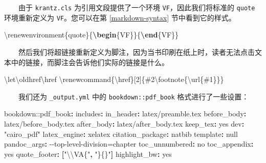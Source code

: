 \documentclass[
  12pt,
]{krantz}
\newenvironment{Shaded}{\begin{snugshade}}{\end{snugshade}}
\newcommand{\AttributeTok}[1]{\textcolor[rgb]{0.77,0.63,0.00}{#1}}
\newcommand{\CharTok}[1]{\textcolor[rgb]{0.31,0.60,0.02}{#1}}
\newcommand{\ExtensionTok}[1]{#1}
\newcommand{\FunctionTok}[1]{\textcolor[rgb]{0.00,0.00,0.00}{#1}}
\newcommand{\KeywordTok}[1]{\textcolor[rgb]{0.13,0.29,0.53}{\textbf{#1}}}
\newcommand{\NormalTok}[1]{#1}
\newcommand{\SpecialCharTok}[1]{\textcolor[rgb]{0.00,0.00,0.00}{#1}}
\newcommand{\StringTok}[1]{\textcolor[rgb]{0.31,0.60,0.02}{#1}}
\theoremstyle{definition}
\theoremstyle{definition}
\theoremstyle{definition}
\theoremstyle{definition}
\theoremstyle{remark}
\begin{document}
  由于 \texttt{krantz.cls} 为引用文段提供了一个环境 \texttt{VF}，因此我们将标准的 \texttt{quote} 环境重新定义为 \texttt{VF}。您可以在第 \ref{markdown-syntax} 节中看到它的样式。

\begin{Shaded}
\begin{Highlighting}[]
\FunctionTok{\textbackslash{}renewenvironment}\NormalTok{\{quote\}\{}\KeywordTok{\textbackslash{}begin}\NormalTok{\{}\ExtensionTok{VF}\NormalTok{\}\}\{}\KeywordTok{\textbackslash{}end}\NormalTok{\{}\ExtensionTok{VF}\NormalTok{\}\}}
\end{Highlighting}
\end{Shaded}

  然后我们将超链接重新定义为脚注，因为当书印刷在纸上时，读者无法点击文本中的链接，而脚注会告诉他们实际的链接是什么。

\begin{Shaded}
\begin{Highlighting}[]
\FunctionTok{\textbackslash{}let\textbackslash{}oldhref\textbackslash{}href}
\FunctionTok{\textbackslash{}renewcommand}\NormalTok{\{}\ExtensionTok{\textbackslash{}href}\NormalTok{\}[2]\{\#2}\FunctionTok{\textbackslash{}footnote}\NormalTok{\{}\FunctionTok{\textbackslash{}url}\NormalTok{\{\#1\}\}\}}
\end{Highlighting}
\end{Shaded}

  我们还为 \texttt{\_output.yml} 中的 \texttt{bookdown::pdf\_book} 格式进行了一些设置：

\begin{Shaded}
\begin{Highlighting}[]
\AttributeTok{bookdown:}\FunctionTok{:pdf\_book}\KeywordTok{:}
\AttributeTok{  }\FunctionTok{includes}\KeywordTok{:}
\AttributeTok{    }\FunctionTok{in\_header}\KeywordTok{:}\AttributeTok{ latex/preamble.tex}
\AttributeTok{    }\FunctionTok{before\_body}\KeywordTok{:}\AttributeTok{ latex/before\_body.tex}
\AttributeTok{    }\FunctionTok{after\_body}\KeywordTok{:}\AttributeTok{ latex/after\_body.tex}
\AttributeTok{  }\FunctionTok{keep\_tex}\KeywordTok{:}\AttributeTok{ }\CharTok{yes}
\AttributeTok{  }\FunctionTok{dev}\KeywordTok{:}\AttributeTok{ }\StringTok{"cairo\_pdf"}
\AttributeTok{  }\FunctionTok{latex\_engine}\KeywordTok{:}\AttributeTok{ xelatex}
\AttributeTok{  }\FunctionTok{citation\_package}\KeywordTok{:}\AttributeTok{ natbib}
\AttributeTok{  }\FunctionTok{template}\KeywordTok{:}\AttributeTok{ }\CharTok{null}
\AttributeTok{  }\FunctionTok{pandoc\_args}\KeywordTok{:}\AttributeTok{ {-}{-}top{-}level{-}division=chapter}
\AttributeTok{  }\FunctionTok{toc\_unnumbered}\KeywordTok{:}\AttributeTok{ }\CharTok{no}
\AttributeTok{  }\FunctionTok{toc\_appendix}\KeywordTok{:}\AttributeTok{ }\CharTok{yes}
\AttributeTok{  }\FunctionTok{quote\_footer}\KeywordTok{:}\AttributeTok{ }\KeywordTok{[}\StringTok{"}\SpecialCharTok{\textbackslash{}\textbackslash{}}\StringTok{VA\{"}\KeywordTok{,}\AttributeTok{ }\StringTok{"\}\{\}"}\KeywordTok{]}
\AttributeTok{  }\FunctionTok{highlight\_bw}\KeywordTok{:}\AttributeTok{ }\CharTok{yes}
\end{Highlighting}
\end{Shaded}
\end{document}
